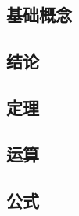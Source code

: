 \documentclass[a4paper,12pt]{article}
\begin{document}
    \subsection{基础概念}

    \begin{enumerate}
    \end{enumerate}

    \subsection{结论}

    \begin{enumerate}
    \end{enumerate}

    \subsection{定理}

    \begin{enumerate}
    \end{enumerate}

    \subsection{运算}

    \begin{enumerate}

    \end{enumerate}

    \subsection{公式}
\end{document}
